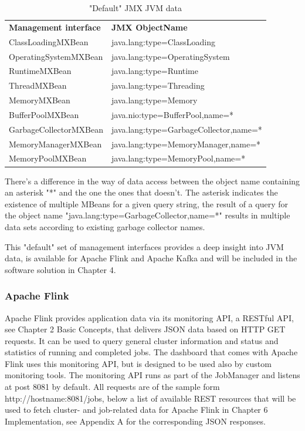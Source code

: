 \begin{table}[H]
    \begin{tabular}{ll}
        \textbf{Management interface} & \textbf{JMX ObjectName} \\
        ClassLoadingMXBean & java.lang:type=ClassLoading \\
        OperatingSystemMXBean & java.lang:type=OperatingSystem \\
        RuntimeMXBean & java.lang:type=Runtime \\
        ThreadMXBean & java.lang:type=Threading \\
        MemoryMXBean & java.lang:type=Memory \\
        BufferPoolMXBean & java.nio:type=BufferPool,name=* \\
        GarbageCollectorMXBean & java.lang:type=GarbageCollector,name=* \\
        MemoryManagerMXBean & java.lang:type=MemoryManager,name=* \\
        MemoryPoolMXBean & java.lang:type=MemoryPool,name=* \\
    \end{tabular}
    \caption{"Default" JMX JVM data}
    \label{tbl:jmxjvmdata}
\end{table}

There's a difference in the way of data access between the object name containing an asterisk "*"
and the one the ones that doesn't. The asterisk indicates the existence of multiple MBeans for a given query string,
the result of a query for the object name "java.lang:type=GarbageCollector,name=*" results in multiple data sets according
to existing garbage collector names.

This "default" set of management interfaces provides a deep insight into JVM data, is
available for Apache Flink and Apache Kafka and will be included in the software solution
in Chapter 4.

\subsubsection{Apache Flink}

Apache Flink provides application data via its monitoring API, a RESTful API, see
Chapter 2 Basic Concepts, that delivers JSON data based on HTTP
GET requests. It can be used to query general cluster information and status and
statistics of running and completed jobs. The dashboard that comes with Apache Flink
uses this monitoring API, but is designed to be used also by custom monitoring tools. The
monitoring API runs as part of the JobManager and listens at post 8081 by default. All requests
are of the sample form http://hostname:8081/jobs, below a list of available REST resources that
will be used to fetch cluster- and job-related data for Apache Flink in Chapter 6 Implementation,
see Appendix A for the corresponding JSON responses.

